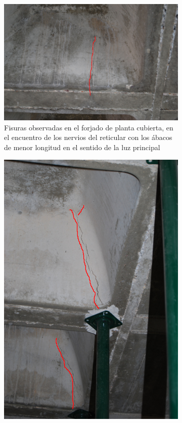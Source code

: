 \documentclass[a4paper,11pt ]{xc_webpage_project}
\begin{document}
  \begin{figure}[h]
  \begin{subfigure}[l]{0.5\textwidth}
  \centering
  \includegraphics[width=\textwidth]{figures/DSC_0086}
  \caption{Fisuras observadas en el forjado de planta cubierta, en el encuentro de los nervios del reticular con los ábacos de menor longitud en el sentido de la luz principal}
  \end{subfigure}
\hfill
  \begin{subfigure}[r]{0.3\textwidth}
  \centering
  \includegraphics[width=\textwidth]{figures/DSC_0101}

\end{subfigure}
\end{figure}
\end{document}
